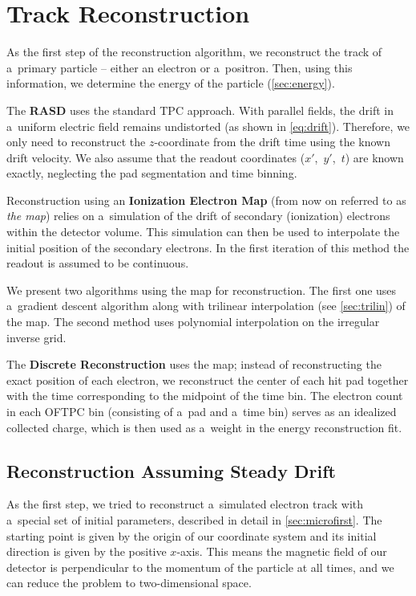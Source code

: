 \chapter{Track Reconstruction}
\label{sec:track}
	As the first step of the reconstruction algorithm, we reconstruct the track of a~primary particle -- either an electron or a~positron. Then, using this information, we determine the energy of the particle (\cref{sec:energy}).
	
	The \textbf{\acf{RASD}} uses the standard \ac{TPC} approach. With parallel fields, the drift in a~uniform electric field remains undistorted (as shown in \cref{eq:drift}). Therefore, we only need to reconstruct the $z$\nobreakdash-coordinate from the drift time using the known drift velocity. We also assume that the readout coordinates ($x'$,~$y'$,~$t$) are known exactly, neglecting the pad segmentation and time binning.
	
	Reconstruction using an \textbf{Ionization Electron Map} (from now on referred to as \emph{the map}) relies on a~simulation of the drift of secondary (ionization) electrons within the detector volume. This simulation can then be used to interpolate the initial position of the secondary electrons. In the first iteration of this method the readout is assumed to be continuous.
	
	We present two algorithms using the map for reconstruction. The first one uses a~gradient descent algorithm along with trilinear interpolation (see \cref{sec:trilin}) of the map. The second method uses polynomial interpolation on the irregular inverse grid.
	
	The \textbf{Discrete Reconstruction} uses the map; instead of reconstructing the exact position of each electron, we reconstruct the center of each hit pad together with the time corresponding to the midpoint of the time bin. The electron count in each \ac{OFTPC} bin (consisting of a~pad and a~time bin) serves as an idealized collected charge, which is then used as a~weight in the energy reconstruction fit.
	
	\section{Reconstruction Assuming Steady Drift}
	\label{sec:rasd}
		As the first step, we tried to reconstruct a~simulated electron track with a~special set of initial parameters, described in detail in \cref{sec:microfirst}. The starting point is given by the origin of our coordinate system and its initial direction is given by the positive $x$\nobreakdash-axis. This means the magnetic field of our detector is perpendicular to the momentum of the particle at all times, and we can reduce the problem to two-dimensional space.
		
